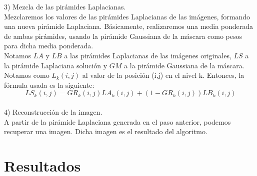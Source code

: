 \documentclass[10pt,a4paper]{article}
\theoremstyle{definition}
\begin{document}
3) Mezcla de las pirámides Laplacianas.\\

Mezclaremos los valores de las pirámides Laplacianas de las imágenes, formando una nueva pirámide Laplaciana. Básicamente, realizaremos una media ponderada de ambas pirámides, usando la pirámide Gaussiana de la máscara como pesos para dicha media ponderada. \\

Notamos $LA$ y $LB$ a las pirámides Laplacianas de las imágenes originales, $LS$ a la pirámide Laplaciana solución y $GM$ a la pirámide Gaussiana de la máscara. Notamos como $L_{k}(i,j)$ al valor de la posición (i,j) en el nivel k. Entonces, la fórmula usada es la siguiente:\\

\[
\ LS_{k}(i,j) = GR_{k}(i,j)LA_{k}(i,j) + (1-GR_{k}(i,j))LB_{k}(i,j)
\]\\

4) Reconstrucción de la imagen.\\

A partir de la pirámide Laplaciana generada en el paso anterior, podemos recuperar una imagen. Dicha imagen es el resultado del algoritmo.\\

\section{Resultados}
\end{document}
